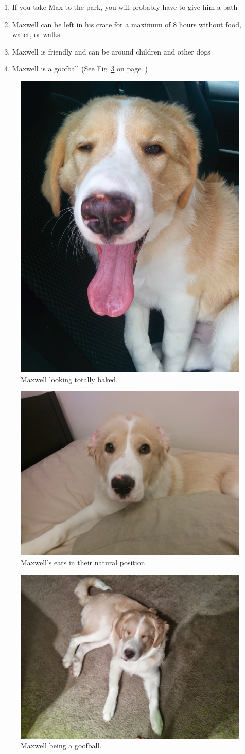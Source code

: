 \documentclass[pdftex,12pt]{article}
\begin{document}
\begin{enumerate}
\begin{enumerate}
                Fig~\ref{fig:natural_ears} on page~\pageref{fig:natural_ears})
            \item If you take Max to the park, you will probably have to give
                him a bath
            \item Maxwell can be left in his crate for a maximum of 8 hours
                without food, water, or walks
            \item Maxwell is friendly and can be around children and other dogs
            \item Maxwell is a goofball (See Fig~\ref{fig:goofball} on
                page~\pageref{fig:goofball})
        \end{enumerate}
\end{enumerate}

\bigskip

\begin{figure}[H]
    \centering
    \includegraphics[width=.35\textwidth]{./images/max/totally_baked.jpg}
    \caption{Maxwell looking totally baked.}
    \label{fig:totally_baked}
\end{figure}

\begin{figure}[H]
    \centering
    \includegraphics[width=.35\textwidth]{./images/max/natural_ears.jpg}
    \caption{Maxwell's ears in their natural position.}
    \label{fig:natural_ears}
\end{figure}

\begin{figure}[H]
    \centering
    \includegraphics[width=.35\textwidth]{./images/max/goofball.jpg}
    \caption{Maxwell being a goofball.}
    \label{fig:goofball}
\end{figure}
\end{document}
